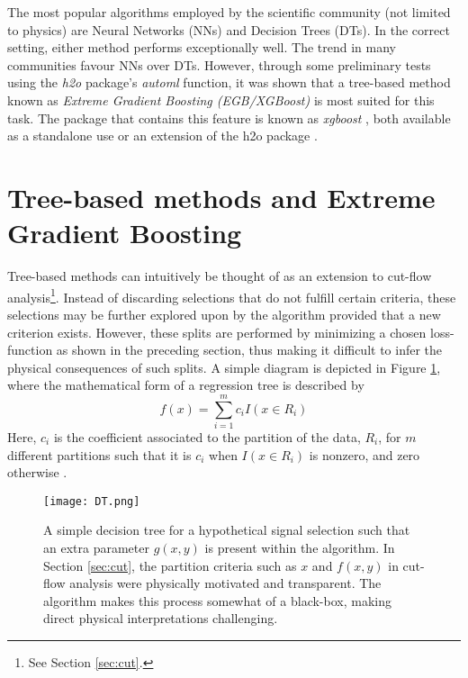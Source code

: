 The most popular algorithms employed by the scientific community (not limited to physics) are Neural Networks (NNs) and Decision Trees (DTs). In the correct setting, either method performs exceptionally well. The trend in many communities favour NNs over DTs. However, through some preliminary tests using the \textit{h2o} package's \cite{h2o} \textit{automl} function, it was shown that a tree-based method known as \textit{Extreme Gradient Boosting (EGB/XGBoost)} is most suited for this task. The package that contains this feature is known as \textit{xgboost} , both available as a standalone use \cite{xgboost} or an extension of the h2o package \cite{h2o}. \\

\section{Tree-based methods and Extreme Gradient Boosting}
\label{sec:method}
Tree-based methods can intuitively be thought of as an extension to cut-flow analysis\footnote{See Section \ref{sec:cut}.}. Instead of discarding selections that do not fulfill certain criteria, these selections may be further explored upon by the algorithm provided that a new criterion exists. However, these splits are performed by minimizing a chosen loss-function as shown in the preceding section, thus making it difficult to infer the physical consequences of such splits. A simple diagram is depicted in Figure \ref{fig:tree}, where the mathematical form of a regression tree is described by
\begin{equation}
    f(x) = \sum_{i=1}^m c_i I(x\in R_i)
    \label{eq:DT}
\end{equation}
Here, $c_i$ is the coefficient associated to the partition of the data, $R_i$, for $m$ different partitions such that it is $c_i$ when $I(x\in R_i)$ is nonzero, and zero otherwise \cite{james2013introduction}. \\

\begin{figure}[htbp]
    \centering
    \texttt{[image: DT.png]}
    \caption{A simple decision tree for a hypothetical signal selection such that an extra parameter $g(x,y)$ is present within the algorithm. In Section \ref{sec:cut}, the partition criteria such as $x$ and $f(x,y)$ in cut-flow analysis were physically motivated and transparent. The algorithm makes this process somewhat of a black-box, making direct physical interpretations challenging.}
    \label{fig:tree}
\end{figure}

